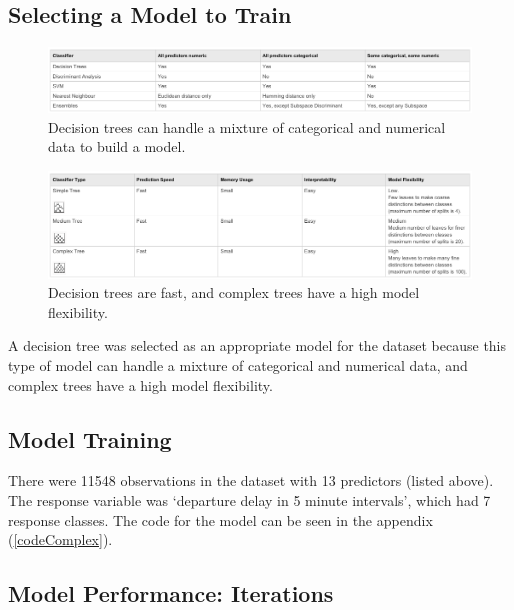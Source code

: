 \documentclass[a4paper, 10pt]{article}
\begin{document}
\vspace{5mm}

\subsection{Selecting a Model to Train}

\begin{figure}[H]
\begin{center}
\includegraphics[scale=0.45]{classifiertypes}
\caption{Decision trees can handle a mixture of categorical and numerical data to build a model.}
\label{classifiertypes}
\end{center}
\end{figure}

\begin{figure}[H]
\begin{center}
\includegraphics[scale=0.45]{decisiontrees}
\caption{Decision trees are fast, and complex trees have a high model flexibility.}
\label{decisiontrees}
\end{center}
\end{figure}

A decision tree was selected as an appropriate model for the dataset because this type of model can handle a mixture of categorical and numerical data, and complex trees have a high model flexibility.

\subsection{Model Training}
There were 11548 observations in the dataset with 13 predictors (listed above). The response variable was `departure delay in 5 minute intervals', which had 7 response classes. The code for the model can be seen in the appendix (\ref{codeComplex}).

\subsection{Model Performance: Iterations}
\end{document}
